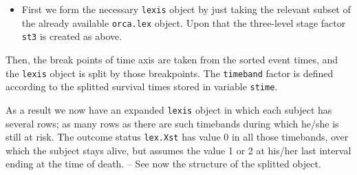 \documentclass[
]{book}
\newenvironment{Shaded}{\begin{snugshade}}{\end{snugshade}}
\newcommand{\AttributeTok}[1]{\textcolor[rgb]{0.13,0.29,0.53}{#1}}
\newcommand{\DecValTok}[1]{\textcolor[rgb]{0.00,0.00,0.81}{#1}}
\newcommand{\FunctionTok}[1]{\textcolor[rgb]{0.13,0.29,0.53}{\textbf{#1}}}
\newcommand{\NormalTok}[1]{#1}
\newcommand{\OtherTok}[1]{\textcolor[rgb]{0.56,0.35,0.01}{#1}}
\newcommand{\SpecialCharTok}[1]{\textcolor[rgb]{0.81,0.36,0.00}{\textbf{#1}}}
\newcommand{\StringTok}[1]{\textcolor[rgb]{0.31,0.60,0.02}{#1}}
\providecommand{\tightlist}{%
  \setlength{\itemsep}{0pt}\setlength{\parskip}{0pt}}
\begin{document}
\begin{itemize}
\tightlist
\item
  First we form the necessary \texttt{lexis} object by just taking
  the relevant subset of the already available \texttt{orca.lex} object.
  Upon that the three-level stage factor \texttt{st3} is created
  as above.
\end{itemize}

\begin{Shaded}
\end{Shaded}

Then, the break points of time axis are taken from
the sorted event times, and the \texttt{lexis} object is
split by those breakpoints. The \texttt{timeband} factor
is defined according to the splitted survival times
stored in variable \texttt{stime}.

\begin{Shaded}
\end{Shaded}

As a result we now have an expanded
\texttt{lexis} object in which each subject has several rows;
as many rows as there are such timebands
during which he/she is still at risk.
The outcome status \texttt{lex.Xst} has value 0 in all those
timebands, over which the subject stays alive, but assumes
the value 1 or 2 at his/her last interval ending at the time of death.
-- See now the structure of the splitted object.
\end{document}
